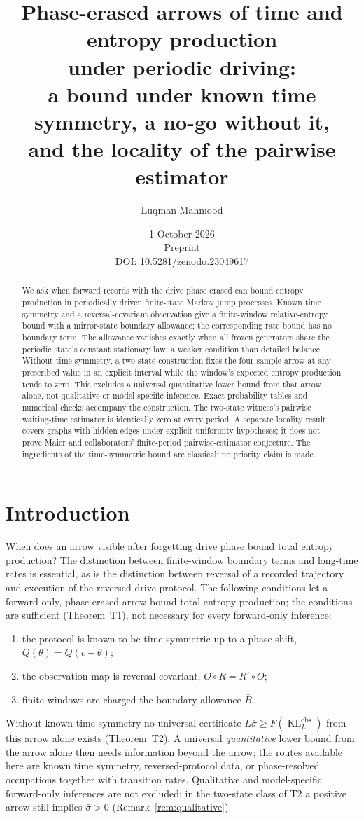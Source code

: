 \documentclass[10pt]{article}
\title{Phase-erased arrows of time and entropy production\\
under periodic driving:\\
a bound under known time symmetry, a no-go without it,\\
and the locality of the pairwise estimator}
\author{Luqman Mahmood}
\date{1 October 2026\\[3pt]\small Preprint\\
DOI: \href{https://doi.org/10.5281/zenodo.23049617}{10.5281/zenodo.23049617}}
\theoremstyle{definition}
\DeclareMathOperator{\KL}{KL}
\newcommand{\sbar}{\bar\sigma}
\newcommand{\Bbar}{\bar B}
\newcommand{\Rrec}{R'}
\begin{document}
\maketitle

\begin{abstract}
We ask when forward records with the drive phase erased can bound entropy
production in periodically driven finite-state Markov jump processes.
Known time symmetry and a reversal-covariant observation give a
finite-window relative-entropy bound with a mirror-state boundary
allowance; the corresponding rate bound has no boundary term.
The allowance vanishes exactly when all frozen generators share the
periodic state's constant stationary law, a weaker condition than detailed
balance. Without time symmetry, a two-state construction fixes the
four-sample arrow at any prescribed value in an explicit interval while
the window's expected entropy production tends to zero. This excludes a
universal quantitative lower bound from that arrow alone, not qualitative
or model-specific inference. Exact probability tables and numerical
checks accompany the construction. The two-state witness's pairwise
waiting-time estimator is identically zero at every period. A separate
locality result covers graphs with hidden edges under explicit uniformity
hypotheses; it does not prove Maier and collaborators' finite-period
pairwise-estimator conjecture.
The ingredients of the time-symmetric bound are classical; no priority
claim is made.
\end{abstract}

\section{Introduction}

When does an arrow visible after forgetting drive phase bound total entropy
production? The distinction between finite-window boundary terms and long-time
rates is essential, as is the distinction between reversal of a recorded
trajectory and execution of the reversed drive protocol.
The following conditions let a forward-only, phase-erased arrow
bound total entropy production; the
conditions are sufficient (Theorem~T1), not necessary for every
forward-only inference:
\begin{enumerate}[label=(\arabic*),nosep]
\item the protocol is known to be time-symmetric up to a phase shift,
  $Q(\theta)=Q(c-\theta)$;
\item the observation map is reversal-covariant, $O\circ R=\Rrec\circ O$;
\item finite windows are charged the boundary allowance $\Bbar$.
\end{enumerate}
Without known time symmetry no universal certificate
$L\sbar\geq F(\KL^{\mathrm{obs}}_L)$ from this arrow alone exists
(Theorem~T2).  A universal \emph{quantitative} lower bound from the
arrow alone then needs information beyond the arrow; the routes available
here are known time symmetry, reversed-protocol data, or phase-resolved
occupations together with transition rates. Qualitative and model-specific
forward-only inferences are not excluded: in the two-state class of T2 a
positive arrow still implies $\sbar>0$
(Remark~\ref{rem:qualitative}).
\end{document}
